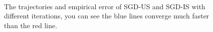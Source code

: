 \documentclass[12pt,a4paper]{article}
\begin{document}
\begin{figure}
	\centering
	\\ %
	\centering

	
	\caption{ The trajectories and empirical error of SGD-US and SGD-IS with different iterations, you can see the blue lines converge much faster than the red line.} %
	\label{img1}
\end{figure}
\end{document}
